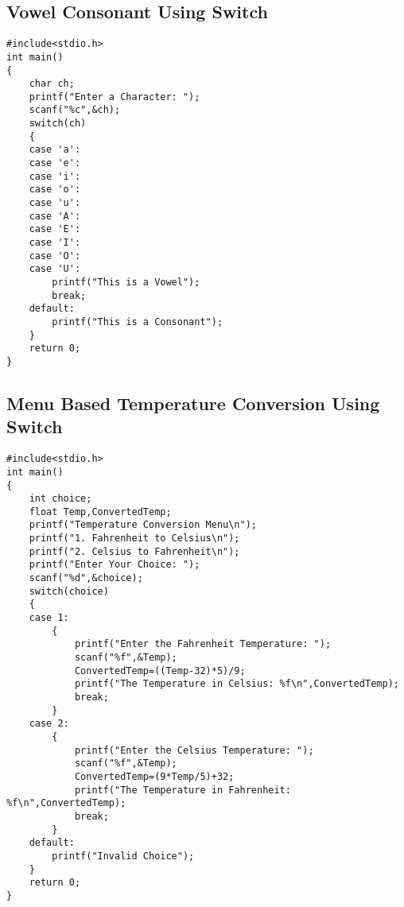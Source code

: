 \documentclass[a4paper,14pt]{article}
\begin{document}
\subsection{Vowel Consonant Using Switch}
\vspace{0.5cm}
\begin{lstlisting}[caption={Vowel Consonant Using Switch}]
#include<stdio.h>
int main()
{
    char ch;
    printf("Enter a Character: ");
    scanf("%c",&ch);
    switch(ch)
    {
    case 'a':
    case 'e':
    case 'i':
    case 'o':
    case 'u':
    case 'A':
    case 'E':
    case 'I':
    case 'O':
    case 'U':
        printf("This is a Vowel");
        break;
    default:
        printf("This is a Consonant");
    }
    return 0;
}
\end{lstlisting}
\newpage

\subsection{Menu Based Temperature Conversion Using Switch}
\vspace{0.5cm}
\begin{lstlisting}[caption={Menu Based Temperature Conversion Using Switch}]
#include<stdio.h>
int main()
{
    int choice;
    float Temp,ConvertedTemp;
    printf("Temperature Conversion Menu\n");
    printf("1. Fahrenheit to Celsius\n");
    printf("2. Celsius to Fahrenheit\n");
    printf("Enter Your Choice: ");
    scanf("%d",&choice);
    switch(choice)
    {
    case 1:
        {
            printf("Enter the Fahrenheit Temperature: ");
            scanf("%f",&Temp);
            ConvertedTemp=((Temp-32)*5)/9;
            printf("The Temperature in Celsius: %f\n",ConvertedTemp);
            break;
        }
    case 2:
        {
            printf("Enter the Celsius Temperature: ");
            scanf("%f",&Temp);
            ConvertedTemp=(9*Temp/5)+32;
            printf("The Temperature in Fahrenheit: %f\n",ConvertedTemp);
            break;
        }
    default:
        printf("Invalid Choice");
    }
    return 0;
}
\end{lstlisting}
\newpage
\end{document}
